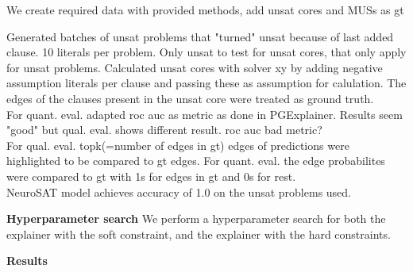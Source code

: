We create required data with provided methods, add unsat cores and MUSs as gt


Generated batches of unsat problems that "turned" unsat because of last added clause. 10 literals per problem. Only unsat to test for unsat cores, that only apply for unsat problems. Calculated unsat cores with solver xy by adding negative assumption literals per clause and passing these as assumption for calulation. The edges of the clauses present in the unsat core were treated as ground truth. \\


For quant. eval. adapted roc auc as metric as done in PGExplainer. Results seem "good" but qual. eval. shows different result. roc auc bad metric? \\
For qual. eval. topk(=number of edges in gt) edges of predictions were highlighted to be compared to gt edges. For quant. eval. the edge probabilites were compared to gt with 1s for edges in gt and 0s for rest. \\

NeuroSAT model achieves accuracy of 1.0 on the unsat problems used.

\textbf{Hyperparameter search}
We perform a hyperparameter search for both the explainer with the soft constraint, and the explainer with the hard constraints.

\textbf{Results}
